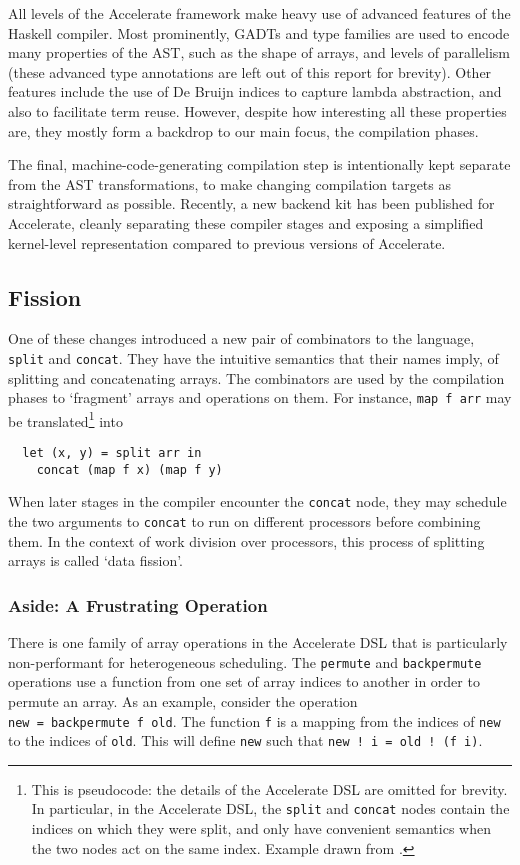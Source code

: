 \documentclass[a4paper,12pt]{article}
\newcommand{\icf}[1]{\mbox{\texttt{#1}}} %
\begin{document}
All levels of the Accelerate framework make heavy use of advanced features of the Haskell compiler.
Most prominently, GADTs and type families are used to encode many properties of the AST, such as the shape of arrays, and levels of parallelism (these advanced type annotations are left out of this report for brevity).
Other features include the use of De Bruijn indices to capture lambda abstraction, and also to facilitate term reuse.
However, despite how interesting all these properties are, they mostly form a backdrop to our main focus, the compilation phases.

The final, machine-code-generating compilation step is intentionally kept separate from the AST transformations, to make changing compilation targets as straightforward as possible.
Recently, a new backend kit has been published for Accelerate, cleanly separating these compiler stages and exposing a simplified kernel-level representation compared to previous versions of Accelerate.

\subsection{Fission}
One of these changes introduced a new pair of combinators to the language, \icf{split} and \icf{concat}.
They have the intuitive semantics that their names imply, of splitting and concatenating arrays.
The combinators are used by the compilation phases to `fragment' arrays and operations on them.
For instance, \icf{map\ f\ arr} may be translated\footnote{This is pseudocode: the details of the Accelerate DSL are omitted for brevity. In particular, in the Accelerate DSL, the \icf{split} and \icf{concat} nodes contain the indices on which they were split, and only have convenient semantics when the two nodes act on the same index. Example drawn from \citet{newton_converting_2014}.} into

\begin{verbatim}
  let (x, y) = split arr in
    concat (map f x) (map f y)
\end{verbatim}

When later stages in the compiler encounter the \icf{concat} node, they may schedule the two arguments to \icf{concat} to run on different processors before combining them.
In the context of work division over processors, this process of splitting arrays is called `data fission'. \citep{newton_converting_2014}

\subsubsection*{Aside: A Frustrating Operation}
There is one family of array operations in the Accelerate DSL that is particularly non-performant for heterogeneous scheduling.
The \icf{permute} and \icf{backpermute} operations use a function from one set of array indices to another in order to permute an array.
As an example, consider the operation \icf{new\ =\ backpermute\ f\ old}.
The function \icf{f} is a mapping from the indices of \icf{new} to the indices of \icf{old}.
This will define \icf{new} such that \icf{new\ !\ i =\ old !\ (f\ i)}.
\end{document}
